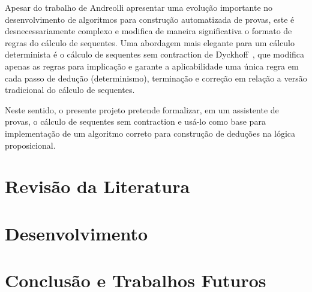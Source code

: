 \documentclass[paper=a4, fontsize=12pt]{article}
\theoremstyle{definition}
\begin{document}
Apesar do trabalho de Andreolli apresentar uma evolução importante no desenvolvimento de algoritmos
para construção automatizada de provas, este é desnecessariamente complexo e modifica de maneira
significativa o formato de regras do cálculo de sequentes. Uma abordagem mais elegante para um
cálculo determinista é o cálculo de sequentes sem contraction de Dyckhoff~\cite{Dyckhoff92}, que modifica
apenas as regras para implicação e garante a aplicabilidade uma única regra em cada passo de dedução
(determinismo), terminação e correção em relação a versão tradicional do cálculo de sequentes.

Neste sentido, o presente projeto pretende formalizar, em um assistente de provas, o cálculo de sequentes
sem contraction e usá-lo como base para implementação de um algoritmo correto para construção de
deduções na lógica proposicional.


\section{Revisão da Literatura}


\section{Desenvolvimento}


\section{Conclusão e Trabalhos Futuros}




\end{document}
